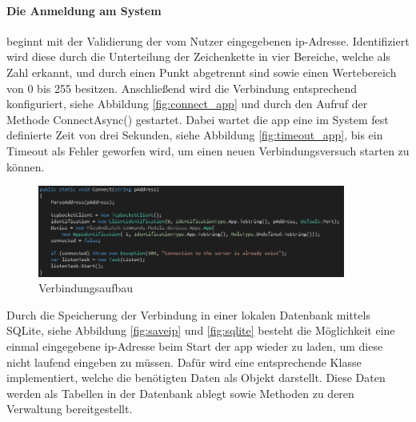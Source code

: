 \paragraph{Die Anmeldung am System} beginnt mit der Validierung der vom Nutzer eingegebenen \gls{ip}-Adresse. Identifiziert wird diese durch die Unterteilung der Zeichenkette in vier Bereiche, welche als Zahl erkannt, und durch einen Punkt abgetrennt sind sowie einen Wertebereich von 0 bis 255 besitzen. Anschließend wird die Verbindung entsprechend konfiguriert, siehe Abbildung \eqref{fig:connect_app} und durch den Aufruf der Methode ConnectAsync() gestartet. Dabei wartet die \gls{app} eine im System fest definierte Zeit von drei Sekunden, siehe Abbildung \eqref{fig:timeout_app}, bis ein Timeout als Fehler geworfen wird, um einen neuen Verbindungsversuch starten zu können.

\begin{figure}[h]
	\begin{center}
		\includegraphics[width=0.9\textwidth]{images/implementation/connect_app.png}
	\end{center}	
	\caption{Verbindungsaufbau}
	\label{fig:connect_app}
\end{figure}

\noindent
Durch die Speicherung der Verbindung in einer lokalen Datenbank mittels SQLite, siehe Abbildung \eqref{fig:saveip} und \eqref{fig:sqlite} besteht die Möglichkeit eine einmal eingegebene \gls{ip}-Adresse beim Start der \gls{app} wieder zu laden, um diese nicht laufend eingeben zu müssen. Dafür wird eine entsprechende Klasse implementiert, welche die benötigten Daten als Objekt darstellt. Diese Daten werden als Tabellen in der Datenbank ablegt sowie Methoden zu deren Verwaltung bereitgestellt.

